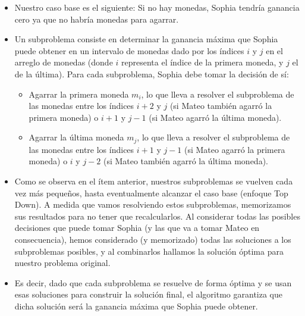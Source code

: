 \begin{itemize}
    \item Nuestro caso base es el siguiente: Si no hay monedas, Sophia tendría ganancia cero ya que no habría monedas para agarrar.
    \item Un subproblema consiste en determinar la ganancia máxima que Sophia puede obtener en un intervalo de monedas dado por los índices \(i\) y \(j\) en el arreglo de monedas (donde \(i\) representa el índice de la primera moneda, y \(j\) el de la última). Para cada subproblema, Sophia debe tomar la decisión de sí:
    \begin{itemize}
        \item Agarrar la primera moneda \(m_i\), lo que lleva a resolver el subproblema de las monedas entre los índices \(i+2\) y \(j\) (si Mateo también agarró la primera moneda) o \(i+1\) y \(j-1\) (si Mateo agarró la última moneda).
        \item Agarrar la última moneda \(m_j\), lo que lleva a resolver el subproblema de las monedas entre los índices \(i+1\) y \(j-1\) (si Mateo agarró la primera moneda) o \(i\) y \(j-2\) (si Mateo también agarró la última moneda).
    \end{itemize}
    \item Como se observa en el ítem anterior, nuestros subproblemas se vuelven cada vez más pequeños, hasta eventualmente alcanzar el caso base (enfoque Top Down). A medida que vamos resolviendo estos subproblemas, memorizamos sus resultados para no tener que recalcularlos. Al considerar todas las posibles decisiones que puede tomar Sophia (y las que va a tomar Mateo en consecuencia), hemos considerado (y memorizado) todas las soluciones a los subproblemas posibles, y al combinarlos hallamos la solución óptima para nuestro problema original.
    \item Es decir, dado que cada subproblema se resuelve de forma óptima y se usan esas soluciones para construir la solución final, el algoritmo garantiza que dicha solución será la ganancia máxima que Sophia puede obtener.
\end{itemize}